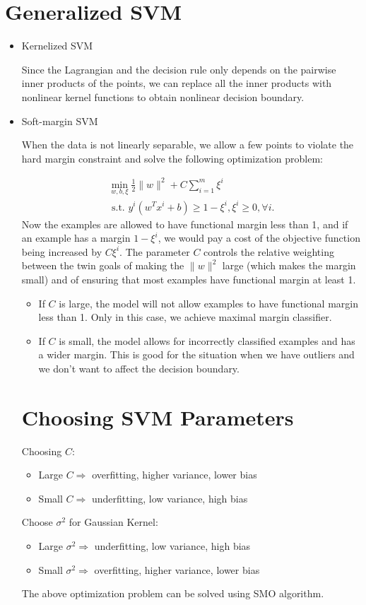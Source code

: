 \documentclass[twoside,12pt]{article}
\begin{document}
\section{Generalized SVM}
\begin{itemize}
\item Kernelized SVM 

Since the Lagrangian and the decision rule only depends on the pairwise inner products of the points, we can replace all the inner products with nonlinear kernel functions to obtain nonlinear decision boundary.
\item Soft-margin SVM 

When the data is not linearly separable, we allow a few points to violate the hard margin constraint and solve the following optimization problem:

\begin{align*}
\min_{w,b,\xi} \frac 1 2 \|w\|^2 + C\sum_{i=1}^m \xi^i \\
\text{ s.t. }  y^i(w^Tx^i + b) \geq 1 - \xi^i, \xi^i \geq 0, \forall i.
\end{align*}
Now the examples are allowed to have functional margin less than 1, and if an example has a margin $ 1 - \xi^i$, we would pay a cost of the objective function being increased by $C\xi^i$. The parameter $C$ controls the relative weighting between the twin goals of making the $\|w\|^2$ large (which makes the margin small) and of ensuring that most examples have functional margin at least 1. \\
\begin{itemize}
\item If $C$ is large, the model will not allow examples to have functional margin less than 1. Only in this case, we achieve maximal margin classifier. 
\item If $C$ is small, the model allows for incorrectly classified examples and has a wider margin. This is good for the situation when we have outliers and we don't want to affect the decision boundary. 
\end{itemize}
\section{Choosing SVM Parameters}
Choosing $C$:
\begin{itemize}
\item Large $C \Rightarrow$ overfitting, higher variance,  lower bias
\item Small $C \Rightarrow$ underfitting, low variance, high bias 
\end{itemize}
Choose $\sigma^2$ for Gaussian Kernel:
\begin{itemize}
\item Large $\sigma^2 \Rightarrow$ underfitting, low variance, high bias 
\item Small $\sigma^2 \Rightarrow$ overfitting, higher variance,  lower bias
\end{itemize}

The above optimization problem can be solved using SMO algorithm. 
\end{itemize}
\end{document}
